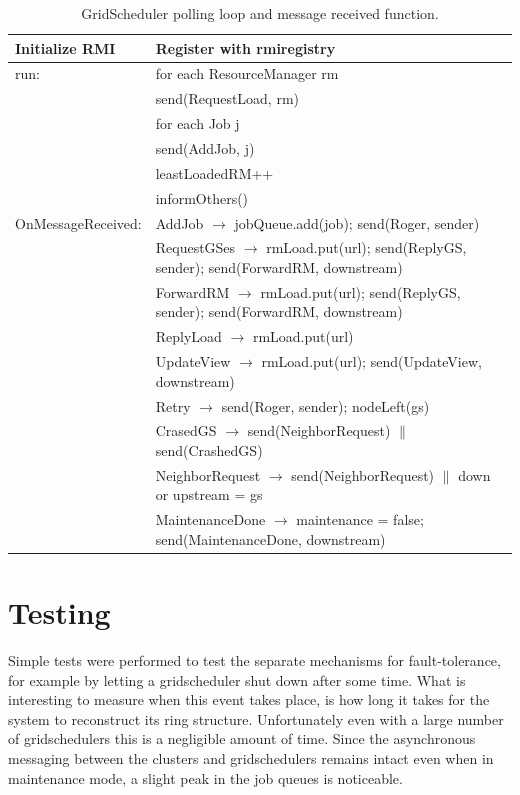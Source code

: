 \documentclass[twocolumn,a4paper]{article}
\begin{document}
\begin{table}
\begin{tabular}{ |l|l| }
  \hline
  Initialize RMI & Register with rmiregistry \\
  \hline
  run: & for each ResourceManager rm\\
  & send(RequestLoad, rm) \\
  & for each Job j\\
  & send(AddJob, j)\\
  & leastLoadedRM++\\
  & informOthers()\\
  \hline
  OnMessageReceived: & AddJob $\rightarrow$ jobQueue.add(job); send(Roger, sender) \\
  & RequestGSes $\rightarrow$ rmLoad.put(url); send(ReplyGS, sender); send(ForwardRM, downstream) \\
  & ForwardRM $\rightarrow$ rmLoad.put(url); send(ReplyGS, sender); send(ForwardRM, downstream) \\
  & ReplyLoad $\rightarrow$ rmLoad.put(url) \\
  & UpdateView $\rightarrow$ rmLoad.put(url); send(UpdateView, downstream) \\
  & Retry $\rightarrow$ send(Roger, sender); nodeLeft(gs) \\
  & CrasedGS $\rightarrow$  send(NeighborRequest) $\|$ send(CrashedGS) \\
  & NeighborRequest $\rightarrow$ send(NeighborRequest) $\|$ down or upstream = gs  \\
  & MaintenanceDone $\rightarrow$ maintenance = false; send(MaintenanceDone, downstream)\\
  \hline
\end{tabular}
\caption{GridScheduler polling loop and message received function.}
\end{table}

\section{Testing}
Simple tests were performed to test the separate mechanisms for fault-tolerance, for example by letting a gridscheduler shut down after some time. What is interesting to measure when this event takes place, is how long it takes for the system to reconstruct its ring structure. Unfortunately even with a large number of gridschedulers this is a negligible amount of time. Since the asynchronous messaging between the clusters and gridschedulers remains intact even when in maintenance mode, a slight peak in the job queues is noticeable.
\end{document}
